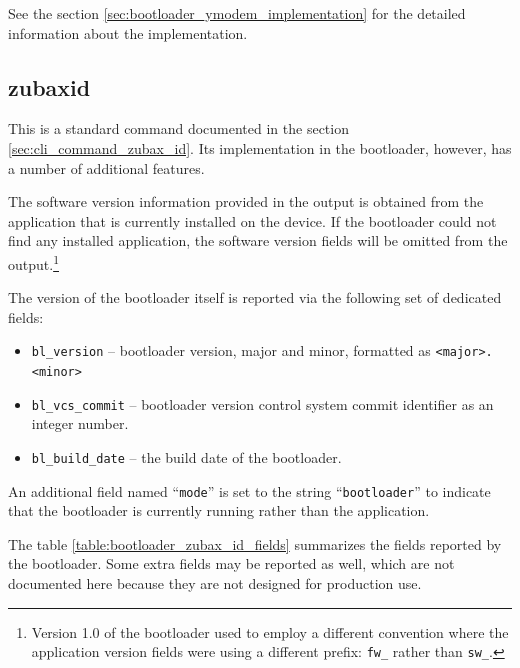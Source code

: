 \documentclass{zubaxdoc}
\begin{document}
See the section \ref{sec:bootloader_ymodem_implementation} for the detailed information about the implementation.

\subsection{zubax\textunderscore{}id}

This is a standard command documented in the section \ref{sec:cli_command_zubax_id}.
Its implementation in the bootloader, however, has a number of additional features.

The software version information provided in the output is obtained from the application that is
currently installed on the device.
If the bootloader could not find any installed application,
the software version fields will be omitted from the
output.\footnote{Version 1.0 of the bootloader used to employ a different convention where the application
version fields were using a different prefix: \texttt{fw\_} rather than \texttt{sw\_}.}

The version of the bootloader itself is reported via the following set of dedicated fields:
\begin{itemize}
    \item \verb|bl_version| -- bootloader version, major and minor, formatted as \verb|<major>.<minor>|
    \item \verb|bl_vcs_commit| -- bootloader version control system commit identifier as an integer number.
    \item \verb|bl_build_date| -- the build date of the bootloader.
\end{itemize}

An additional field named ``\verb|mode|'' is set to the string ``\verb|bootloader|''
to indicate that the bootloader is currently running rather than the application.

The table \ref{table:bootloader_zubax_id_fields} summarizes the fields reported by the bootloader.
Some extra fields may be reported as well,
which are not documented here because they are not designed for production use.
\end{document}
